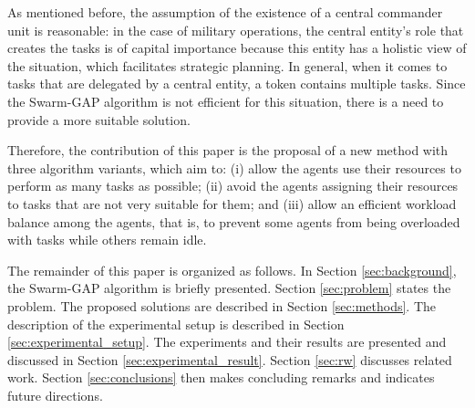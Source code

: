 As mentioned before, the assumption of the existence of a central commander unit is reasonable: in  the case of military operations, the central entity's role that creates the tasks is of capital importance because this entity has a holistic view of the situation, which facilitates strategic planning. In general, when it comes to tasks that are delegated by a central entity, a token contains multiple tasks. Since the Swarm-GAP algorithm is not efficient for this situation, there is a need to  provide a more suitable solution.

Therefore, the contribution of this paper is the proposal of a new method with three algorithm variants, which aim to: (i) allow the agents use their resources to perform as many tasks as possible; (ii) avoid the agents assigning their resources to tasks that are not very suitable for them; and (iii) allow an efficient workload balance among the agents, that is, to prevent some agents from being overloaded with tasks while others remain idle.

The remainder of this paper is organized as follows. In Section \ref{sec:background}, the Swarm-GAP algorithm is briefly  presented. Section \ref{sec:problem} states the problem. The proposed solutions are described in Section \ref{sec:methods}. The description of the experimental setup is described in Section \ref{sec:experimental_setup}. The experiments and their results are presented and discussed in Section \ref{sec:experimental_result}. Section \ref{sec:rw} discusses related work. Section \ref{sec:conclusions} then makes concluding remarks and indicates future directions.